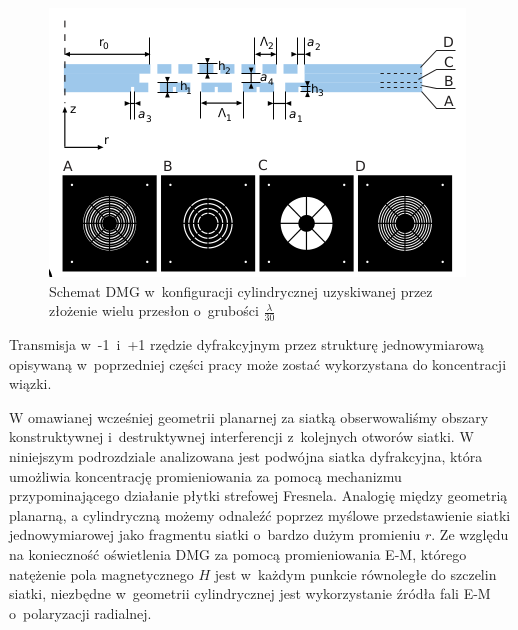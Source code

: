 \begin{figure}[htb]
	\includegraphics[width=\textwidth]{images/dmg/express_siatki.png}
	\caption{Schemat DMG w~konfiguracji cylindrycznej uzyskiwanej przez złożenie wielu przesłon o~grubości $\frac{\lambda}{30}$ \cite{Yavorskiy:14}}
	\label{fig:schem-cyl}
\end{figure}

Transmisja w~-1~i~+1 rzędzie dyfrakcyjnym przez strukturę jednowymiarową opisywaną w~poprzedniej części pracy może zostać wykorzystana do koncentracji wiązki. 

W omawianej wcześniej geometrii planarnej za siatką obserwowaliśmy obszary konstruktywnej i~destruktywnej interferencji z~kolejnych otworów siatki. W niniejszym podrozdziale analizowana jest podwójna siatka dyfrakcyjna, która umożliwia koncentrację promieniowania za pomocą mechanizmu przypominającego działanie płytki strefowej Fresnela. Analogię między geometrią planarną, a cylindryczną możemy odnaleźć poprzez myślowe przedstawienie siatki jednowymiarowej jako fragmentu siatki o~bardzo dużym promieniu $r$. Ze względu na konieczność oświetlenia DMG za pomocą promieniowania E-M, którego natężenie pola magnetycznego $H$ jest w~każdym punkcie równoległe do szczelin siatki, niezbędne w~geometrii cylindrycznej jest wykorzystanie źródła fali E-M o~polaryzacji radialnej. 


